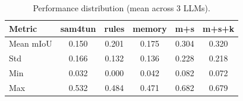 \begin{table}[ht]
\caption{Performance distribution (mean across 3 LLMs).}\label{tab:distribution}
\begin{tabular*}{\tblwidth}{@{} l c c c c c @{}}
\toprule
Metric & sam4tun & rules & memory & m+s & m+s+k \\
\midrule
Mean mIoU & 0.150 & 0.201 & 0.175 & 0.304 & 0.320 \\
Std & 0.166 & 0.132 & 0.136 & 0.228 & 0.218 \\
Min & 0.032 & 0.000 & 0.042 & 0.082 & 0.072 \\
Max & 0.532 & 0.484 & 0.471 & 0.682 & 0.679 \\
\bottomrule
\end{tabular*}
\end{table}
